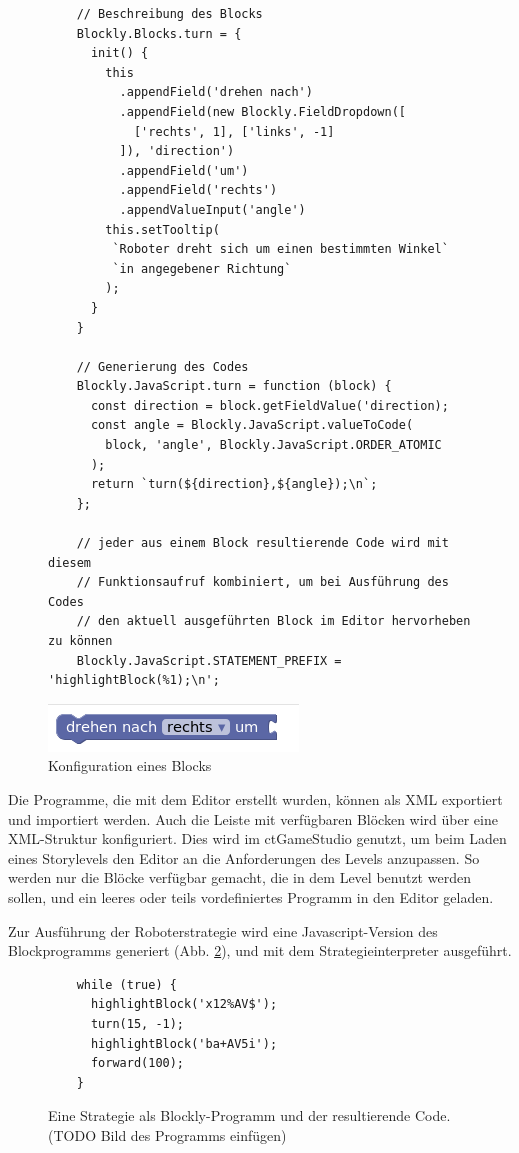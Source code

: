 \begin{figure}
  \label{block-configuration}
  \caption{Konfiguration eines Blocks}
  \begin{lstlisting}
    // Beschreibung des Blocks
    Blockly.Blocks.turn = {
      init() {
        this
          .appendField('drehen nach')
          .appendField(new Blockly.FieldDropdown([
            ['rechts', 1], ['links', -1]
          ]), 'direction')
          .appendField('um')
          .appendField('rechts')
          .appendValueInput('angle')
        this.setTooltip(
         `Roboter dreht sich um einen bestimmten Winkel`
         `in angegebener Richtung`
        );
      }
    }

    // Generierung des Codes
    Blockly.JavaScript.turn = function (block) {
      const direction = block.getFieldValue('direction);
      const angle = Blockly.JavaScript.valueToCode(
        block, 'angle', Blockly.JavaScript.ORDER_ATOMIC
      );
      return `turn(${direction},${angle});\n`;
    };

    // jeder aus einem Block resultierende Code wird mit diesem
    // Funktionsaufruf kombiniert, um bei Ausführung des Codes
    // den aktuell ausgeführten Block im Editor hervorheben zu können
    Blockly.JavaScript.STATEMENT_PREFIX = 'highlightBlock(%1);\n';
  \end{lstlisting}

  \includegraphics{figures/blockly_configuration_turn.png}
\end{figure}

Die Programme, die mit dem Editor erstellt wurden, können als XML exportiert und importiert werden.
Auch die Leiste mit verfügbaren Blöcken wird über eine XML-Struktur konfiguriert. Dies wird im
ctGameStudio genutzt, um beim Laden eines Storylevels den Editor an die Anforderungen des Levels
anzupassen. So werden nur die Blöcke verfügbar gemacht, die in dem Level benutzt werden sollen, und
ein leeres oder teils vordefiniertes Programm in den Editor geladen.

Zur Ausführung der Roboterstrategie wird eine Javascript-Version des Blockprogramms generiert (Abb.
\ref{code-generation}), und mit dem Strategieinterpreter ausgeführt.

\begin{figure}
  \label{code-generation}

  \caption{Eine Strategie als Blockly-Programm und der resultierende Code. (TODO Bild des Programms einfügen)}

  \begin{lstlisting}
    while (true) {
      highlightBlock('x12%AV$');
      turn(15, -1);
      highlightBlock('ba+AV5i');
      forward(100);
    }
  \end{lstlisting}
\end{figure}


